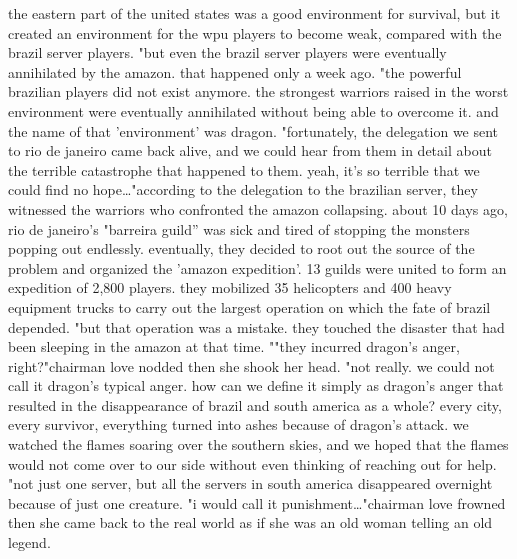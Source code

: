 the eastern part of the united states was a good environment for survival, but it created an environment for the wpu players to become weak, compared with the brazil server players.
"but even the brazil server players were eventually annihilated by the amazon.
 that happened only a week ago.
"the powerful brazilian players did not exist anymore.
 the strongest warriors raised in the worst environment were eventually annihilated without being able to overcome it.
 and the name of that 'environment' was dragon.
 "fortunately, the delegation we sent to rio de janeiro came back alive, and we could hear from them in detail about the terrible catastrophe that happened to them.
 yeah, it's so terrible that we could find no hope…"according to the delegation to the brazilian server, they witnessed the warriors who confronted the amazon collapsing.
 about 10 days ago, rio de janeiro's "barreira guild'' was sick and tired of stopping the monsters popping out endlessly.
 eventually, they decided to root out the source of the problem and organized the 'amazon expedition'.
13 guilds were united to form an expedition of 2,800 players.
 they mobilized 35 helicopters and 400 heavy equipment trucks to carry out the largest operation on which the fate of brazil depended.
"but that operation was a mistake.
 they touched the disaster that had been sleeping in the amazon at that time.
""they incurred dragon's anger, right?"chairman love nodded then she shook her head.
"not really.
 we could not call it dragon's typical anger.
 how can we define it simply as dragon's anger that resulted in the disappearance of brazil and south america as a whole? every city, every survivor, everything turned into ashes because of dragon's attack.
 we watched the flames soaring over the southern skies, and we hoped that the flames would not come over to our side without even thinking of reaching out for help.
"not just one server, but all the servers in south america disappeared overnight because of just one creature.
"i would call it punishment…"chairman love frowned then she came back to the real world as if she was an old woman telling an old legend.

